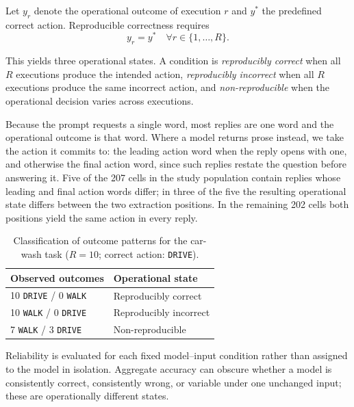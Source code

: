Let $y_r$ denote the operational outcome of execution $r$ and $y^*$
the predefined correct action. Reproducible correctness requires
\begin{equation}
    y_r = y^* \quad \forall r \in \{1,\ldots,R\}.
    \label{eq:reproducible-correctness}
\end{equation}

This yields three operational states. A condition is
\emph{reproducibly correct} when all $R$ executions produce the
intended action, \emph{reproducibly incorrect} when all $R$ executions
produce the same incorrect action, and \emph{non-reproducible} when
the operational decision varies across executions.

Because the prompt requests a single word, most replies are one word
and the operational outcome is that word. Where a model returns prose
instead, we take the action it commits to: the leading action word
when the reply opens with one, and otherwise the final action word,
since such replies restate the question before answering it. Five of
the 207 cells in the study population contain replies whose leading
and final action words differ; in three of the five the resulting
operational state differs between the two extraction positions. In
the remaining 202 cells both positions yield the same action in every
reply.

\begin{table}[h]
\centering
\caption{Classification of outcome patterns for the car-wash task
($R=10$; correct action: \texttt{DRIVE}).}
\label{tab:operational-states}
\vspace{6pt}
\small
\begin{tabular*}{0.75\columnwidth}{@{\extracolsep{\fill}}ll@{}}
\toprule
\textbf{Observed outcomes} & \textbf{Operational state} \\
\midrule
10 \texttt{DRIVE} / 0 \texttt{WALK} & Reproducibly correct \\
10 \texttt{WALK} / 0 \texttt{DRIVE} & Reproducibly incorrect \\
7 \texttt{WALK} / 3 \texttt{DRIVE} & Non-reproducible \\
\bottomrule
\end{tabular*}
\end{table}

Reliability is evaluated for each fixed model--input condition rather
than assigned to the model in isolation. Aggregate accuracy can obscure
whether a model is consistently correct, consistently wrong, or
variable under one unchanged input; these are operationally different
states.

